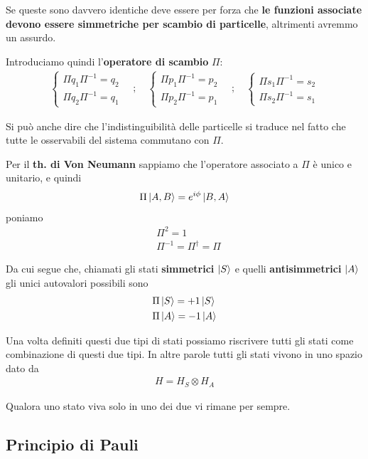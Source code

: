 Se queste sono davvero identiche deve essere per forza che \textbf{le funzioni associate devono essere simmetriche per scambio di particelle}, altrimenti avremmo un assurdo.

Introduciamo quindi l'\textbf{operatore di scambio} $\Pi$:
\begin{align}
\left\{
\begin{array}{cc}
\Pi q_1\Pi^{-1}=q_2 \\
\Pi q_2\Pi^{-1}=q_1
\end{array}
\right.
\quad ; \quad
\left\{
\begin{array}{cc}
\Pi p_1\Pi^{-1}=p_2 \\
\Pi p_2\Pi^{-1}=p_1
\end{array}
\right.
\quad ; \quad
\left\{
\begin{array}{cc}
\Pi s_1\Pi^{-1}=s_2 \\
\Pi s_2\Pi^{-1}=s_1
\end{array}
\right.
\end{align}

Si può anche dire che l'indistinguibilità delle particelle si traduce nel fatto che tutte le osservabili del sistema commutano con $\Pi$.

Per il \textbf{th. di Von Neumann} sappiamo che l'operatore associato a $\Pi$ è unico e unitario, e quindi
\begin{align}
\Pi\ket{A,B}=e^{i\phi}\ket{B,A}
\end{align}
poniamo
\begin{align}
{}&\Pi^2=1\\
&\Pi^{-1}=\Pi^\dagger=\Pi
\end{align}

Da cui segue che, chiamati gli stati \textbf{simmetrici} $\ket{S}$ e quelli \textbf{antisimmetrici} $\ket{A}$ gli unici autovalori possibili sono
\begin{align}
{}&\Pi\ket{S} = +1\ket{S} \\
&\Pi\ket{A} = -1\ket{A}
\end{align}

Una volta definiti questi due tipi di stati possiamo riscrivere tutti gli stati come combinazione di questi due tipi. In altre parole tutti gli stati vivono in uno spazio dato da
\begin{align}
H=H_S \otimes H_A
\end{align}

Qualora uno stato viva solo in uno dei due vi rimane per sempre.

\subsection{Principio di Pauli}

